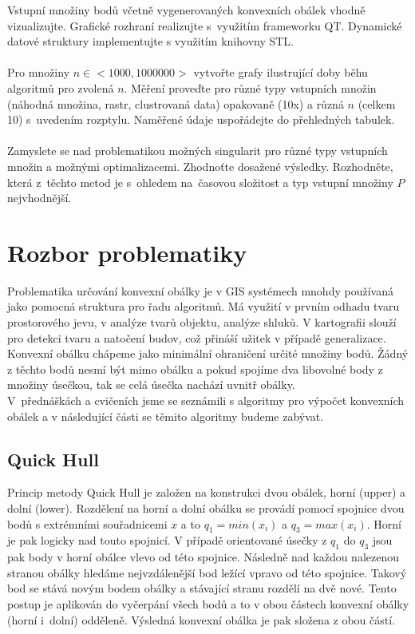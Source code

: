 \documentclass{article}
\begin{document}
Vstupní množiny bodů včetně vygenerovaných konvexních obálek vhodně vizualizujte. Grafické rozhraní realizujte s~využitím frameworku QT. Dynamické datové struktury implementujte s využitím knihovny STL.\\
\\
Pro množiny $n\in <1000,1000000>$ vytvořte grafy ilustrující doby běhu algoritmů pro zvolená $n$. Měření proveďte pro různé typy vstupních množin (náhodná množina, rastr, clustrovaná data) opakovaně (10x) a různá $n$ (celkem 10) s~uvedením rozptylu. Naměřené údaje uspořádejte do přehledných tabulek.\\
\\
Zamyslete se nad problematikou možných singularit pro různé typy vstupních množin a možnými optimalizacemi. Zhodnoťte dosažené výsledky. Rozhodněte, která z~těchto metod je s~ohledem na~časovou složitost a typ vstupní množiny $P$ nejvhodnější.

\section{Rozbor problematiky}
Problematika určování konvexní obálky je v GIS systémech mnohdy používaná jako pomocná struktura pro řadu algoritmů. Má využití v prvním odhadu tvaru prostorového jevu, v analýze tvarů objektu, analýze shluků. V kartografii slouží pro detekci tvaru a natočení budov, což přináší užitek v případě generalizace.\\

Konvexní obálku chápeme jako minimální ohraničení určité množiny bodů. Žádný z těchto bodů nesmí být mimo obálku a pokud spojíme dva libovolné body z množiny úsečkou, tak se celá úsečka nachází uvnitř obálky.\\

V~přednáškách a cvičeních jsme se seznámili s algoritmy  pro výpočet konvexních obálek a v následující části se těmito algoritmy budeme zabývat.

\subsection{Quick Hull}
Princip metody Quick Hull je založen na konstrukci dvou obálek, horní (upper) a dolní (lower). Rozdělení na horní a dolní obálku se provádí pomocí spojnice dvou bodů s extrémními souřadnicemi $x$ a to $q_1 = min(x_i)$ a $q_3 = max(x_i)$. Horní je pak logicky nad touto spojnicí. V případě orientované úsečky z $q_1$ do $q_3$ jsou pak body v horní obálce vlevo od této spojnice. Následně nad každou nalezenou stranou obálky hledáme nejvzdálenější bod ležící vpravo od této spojnice. Takový bod se stává novým bodem obálky a stávající stranu rozdělí na dvě nové. Tento postup je aplikován do vyčerpání všech bodů a to v obou částech konvexní obálky (horní i~dolní) odděleně. Výsledná konvexní obálka je pak složena z obou částí.
\end{document}
